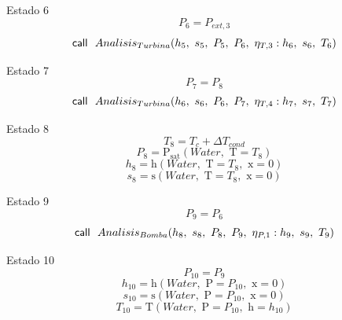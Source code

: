 \documentclass[10pt,fleqn]{article}
\theoremstyle{mytheoremstyle}
\theoremstyle{mytheoremstyle}
\theoremstyle{myproblemstyle}
\newcommand{\F}[1]{\mbox{$#1$}}
\newcommand{\K}[1]{\mbox{\sf#1\ \ \mit}}
\newcommand{\temperature}{\mathrm{T}}
\newcommand{\enthalpy}{\mathrm{h}}
\newcommand{\entropy}{\mathrm{s}}
\newcommand{\psat}{\mathrm{P_{sat}}}
\begin{document}
\vspace{0.10in}
\noindent
{\color{blue} \rm Estado 6}
\begin{equation}
\label{EES Eqn:46}
P_{6}=P_{ext,3} 
\end{equation}
\begin{equation}
\label{EES Eqn:47}
\K{call} \F{Analisis_{Turbina}}{ \left( h_{5},\ s_{5},\ P_{5},\ P_{6},\ \eta_{T,3}:h_{6},\ s_{6},\ T_{6} \right) } 
\end{equation}

\vspace{0.10in}
\noindent
{\color{blue} \rm Estado 7}
\begin{equation}
\label{EES Eqn:48}
P_{7}=P_{8} 
\end{equation}
\begin{equation}
\label{EES Eqn:49}
\K{call} \F{Analisis_{Turbina}}{ \left( h_{6},\ s_{6},\ P_{6},\ P_{7},\ \eta_{T,4}:h_{7},\ s_{7},\ T_{7} \right) } 
\end{equation}

\vspace{0.10in}
\noindent
{\color{blue} \rm Estado 8}
\begin{equation}
\label{EES Eqn:50}
T_{8}=T_{c}+{\Delta T}_{cond} 
\end{equation}
\begin{equation}
\label{EES Eqn:51}
P_{8}=\psat \left(\F{Water},\mbox{\ T}=T_{8} \right)  
\end{equation}
\begin{equation}
\label{EES Eqn:52}
h_{8}=\enthalpy \left(\F{Water},\mbox{\ T}=T_{8},\mbox{\ x}=0 \right)  
\end{equation}
\begin{equation}
\label{EES Eqn:53}
s_{8}=\entropy \left(\F{Water},\mbox{\ T}=T_{8},\mbox{\ x}=0 \right)  
\end{equation}

\vspace{0.10in}
\noindent
{\color{blue} \rm Estado 9}
\begin{equation}
\label{EES Eqn:54}
P_{9}=P_{6} 
\end{equation}
\begin{equation}
\label{EES Eqn:55}
\K{call} \F{Analisis_{Bomba}}{ \left( h_{8},\ s_{8},\ P_{8},\ P_{9},\ \eta_{P,1}:h_{9},\ s_{9},\ T_{9} \right) } 
\end{equation}

\vspace{0.10in}
\noindent
{\color{blue} \rm Estado 10}
\begin{equation}
\label{EES Eqn:56}
P_{10}=P_{9} 
\end{equation}
\begin{equation}
\label{EES Eqn:57}
h_{10}=\enthalpy \left(\F{Water},\mbox{\ P}=P_{10},\mbox{\ x}=0 \right)  
\end{equation}
\begin{equation}
\label{EES Eqn:58}
s_{10}=\entropy \left(\F{Water},\mbox{\ P}=P_{10},\mbox{\ x}=0 \right)  
\end{equation}
\begin{equation}
\label{EES Eqn:59}
T_{10}=\temperature \left(\F{Water},\mbox{\ P}=P_{10},\mbox{\ h}=h_{10} \right)  
\end{equation}
\end{document}
